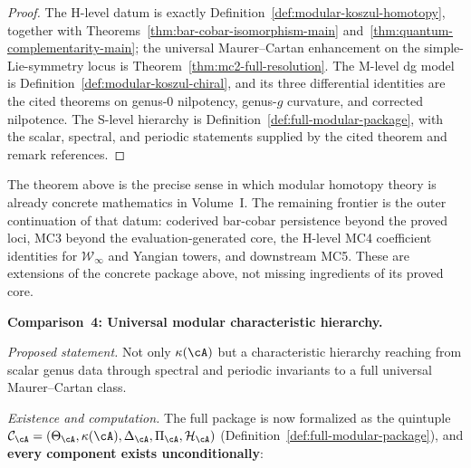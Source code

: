 \begin{proof}
The H-level datum is exactly
Definition~\ref{def:modular-koszul-homotopy}, together with
Theorems~\ref{thm:bar-cobar-isomorphism-main}
and~\ref{thm:quantum-complementarity-main}; the universal
Maurer--Cartan enhancement on the simple-Lie-symmetry locus is
Theorem~\ref{thm:mc2-full-resolution}.  The M-level dg model is
Definition~\ref{def:modular-koszul-chiral}, and its three
differential identities are the cited theorems on genus-$0$
nilpotency, genus-$g$ curvature, and corrected nilpotence.  The
S-level hierarchy is
Definition~\ref{def:full-modular-package}, with the scalar,
spectral, and periodic statements supplied by the cited theorem and
remark references.
\end{proof}

\begin{remark}
\label{rem:volume-one-concrete-modular-datum-frontier}
The theorem above is the precise sense in which modular homotopy
theory is already concrete mathematics in Volume~I.  The remaining
frontier is the outer continuation of that datum: coderived
bar-cobar persistence beyond the proved loci, MC3 beyond the
evaluation-generated core, the H-level MC4 coefficient identities for
$\mathcal{W}_\infty$ and Yangian towers, and downstream MC5.  These
are extensions of the concrete package above, not missing ingredients
of its proved core.
\end{remark}

\medskip

\noindent\textbf{Comparison~4: Universal modular characteristic hierarchy.}

\emph{Proposed statement.}
Not only $\kappa(\cA)$ but a characteristic hierarchy reaching from
scalar genus data through spectral and periodic invariants to a full
universal Maurer--Cartan class.

\emph{Existence and computation.}
The full package is now formalized as the quintuple
$\mathcal{C}_{\cA} = (\Theta_{\cA}, \kappa(\cA), \Delta_{\cA},
\Pi_{\cA}, \mathcal{H}_{\cA})$
(Definition~\ref{def:full-modular-package}), and \textbf{every
component exists unconditionally}:

